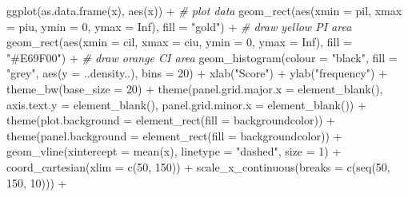 \documentclass[
  oneside]{krantz}
\makeatletter
\newenvironment{Shaded}{\begin{snugshade}}{\end{snugshade}}
\newcommand{\AttributeTok}[1]{\textcolor[rgb]{0.61,0.61,0.61}{#1}}
\newcommand{\CommentTok}[1]{\textcolor[rgb]{0.37,0.37,0.37}{\textit{#1}}}
\newcommand{\ConstantTok}[1]{\textcolor[rgb]{0,0,0}{#1}}
\newcommand{\DecValTok}[1]{\textcolor[rgb]{0.06,0.06,0.06}{#1}}
\newcommand{\FunctionTok}[1]{\textcolor[rgb]{0,0,0}{#1}}
\newcommand{\NormalTok}[1]{#1}
\newcommand{\SpecialCharTok}[1]{\textcolor[rgb]{0,0,0}{#1}}
\newcommand{\StringTok}[1]{\textcolor[rgb]{0.5,0.5,0.5}{#1}}
\newenvironment{kframe}{%
\medskip{}
\setlength{\fboxsep}{.8em}
 \def\at@end@of@kframe{}%
 \ifinner\ifhmode%
  \def\at@end@of@kframe{\end{minipage}}%
  \begin{minipage}{\columnwidth}%
 \fi\fi%
 \def\FrameCommand##1{\hskip\@totalleftmargin \hskip-\fboxsep
 \colorbox{shadecolor}{##1}\hskip-\fboxsep
     \hskip-\linewidth \hskip-\@totalleftmargin \hskip\columnwidth}%
 \MakeFramed {\advance\hsize-\width
   \@totalleftmargin\z@ \linewidth\hsize
   \@setminipage}}%
 {\par\unskip\endMakeFramed%
 \at@end@of@kframe}
\renewenvironment{Shaded}{\begin{kframe}}{\end{kframe}}
\makeatother
\begin{document}
\begin{Shaded}
\begin{Highlighting}[]
\FunctionTok{ggplot}\NormalTok{(}\FunctionTok{as.data.frame}\NormalTok{(x), }\FunctionTok{aes}\NormalTok{(x)) }\SpecialCharTok{+} \CommentTok{\# plot data}
  \FunctionTok{geom\_rect}\NormalTok{(}\FunctionTok{aes}\NormalTok{(}\AttributeTok{xmin =}\NormalTok{ pil, }\AttributeTok{xmax =}\NormalTok{ piu, }\AttributeTok{ymin =} \DecValTok{0}\NormalTok{, }\AttributeTok{ymax =} \ConstantTok{Inf}\NormalTok{),}
            \AttributeTok{fill =} \StringTok{"gold"}\NormalTok{) }\SpecialCharTok{+} \CommentTok{\# draw yellow PI area}
  \FunctionTok{geom\_rect}\NormalTok{(}\FunctionTok{aes}\NormalTok{(}\AttributeTok{xmin =}\NormalTok{ cil, }\AttributeTok{xmax =}\NormalTok{ ciu, }\AttributeTok{ymin =} \DecValTok{0}\NormalTok{, }\AttributeTok{ymax =} \ConstantTok{Inf}\NormalTok{),}
            \AttributeTok{fill =} \StringTok{"\#E69F00"}\NormalTok{) }\SpecialCharTok{+} \CommentTok{\# draw orange CI area}
  \FunctionTok{geom\_histogram}\NormalTok{(}\AttributeTok{colour =} \StringTok{"black"}\NormalTok{, }\AttributeTok{fill =} \StringTok{"grey"}\NormalTok{, }\FunctionTok{aes}\NormalTok{(}\AttributeTok{y =}\NormalTok{ ..density..), }\AttributeTok{bins =} \DecValTok{20}\NormalTok{) }\SpecialCharTok{+}
  \FunctionTok{xlab}\NormalTok{(}\StringTok{"Score"}\NormalTok{) }\SpecialCharTok{+}
  \FunctionTok{ylab}\NormalTok{(}\StringTok{"frequency"}\NormalTok{) }\SpecialCharTok{+}
  \FunctionTok{theme\_bw}\NormalTok{(}\AttributeTok{base\_size =} \DecValTok{20}\NormalTok{) }\SpecialCharTok{+}
  \FunctionTok{theme}\NormalTok{(}\AttributeTok{panel.grid.major.x =} \FunctionTok{element\_blank}\NormalTok{(), }\AttributeTok{axis.text.y =} \FunctionTok{element\_blank}\NormalTok{(),}
        \AttributeTok{panel.grid.minor.x =} \FunctionTok{element\_blank}\NormalTok{()) }\SpecialCharTok{+} 
  \FunctionTok{theme}\NormalTok{(}\AttributeTok{plot.background =} \FunctionTok{element\_rect}\NormalTok{(}\AttributeTok{fill =}\NormalTok{ backgroundcolor))  }\SpecialCharTok{+} 
  \FunctionTok{theme}\NormalTok{(}\AttributeTok{panel.background =} \FunctionTok{element\_rect}\NormalTok{(}\AttributeTok{fill =}\NormalTok{ backgroundcolor)) }\SpecialCharTok{+}
  \FunctionTok{geom\_vline}\NormalTok{(}\AttributeTok{xintercept =} \FunctionTok{mean}\NormalTok{(x), }\AttributeTok{linetype =} \StringTok{"dashed"}\NormalTok{, }\AttributeTok{size =} \DecValTok{1}\NormalTok{) }\SpecialCharTok{+}
  \FunctionTok{coord\_cartesian}\NormalTok{(}\AttributeTok{xlim =} \FunctionTok{c}\NormalTok{(}\DecValTok{50}\NormalTok{, }\DecValTok{150}\NormalTok{)) }\SpecialCharTok{+}
  \FunctionTok{scale\_x\_continuous}\NormalTok{(}\AttributeTok{breaks =} \FunctionTok{c}\NormalTok{(}\FunctionTok{seq}\NormalTok{(}\DecValTok{50}\NormalTok{, }\DecValTok{150}\NormalTok{, }\DecValTok{10}\NormalTok{))) }\SpecialCharTok{+}

\end{Highlighting}
\end{Shaded}
\end{document}
